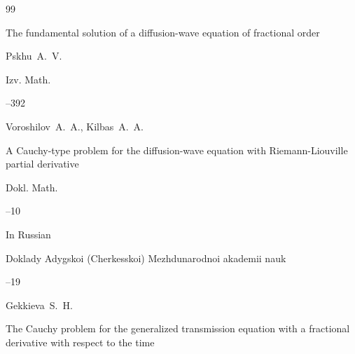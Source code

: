 \begin{thebibliography}{99}

\paper The fundamental solution of a diffusion-wave equation of fractional order

\by Pskhu~A.~V.

\jour Izv. Math.




--392










\by Voroshilov~A.~A., Kilbas~A.~A.

\paper A Cauchy-type problem for the diffusion-wave equation with Riemann-Liouville partial derivative

\jour Dokl. Math.




--10 





\lang In Russian

\jour Doklady Adygskoi (Cherkesskoi) Mezhdunarodnoi akademii nauk




--19

\by Gekkieva~S.~H.

\paper The Cauchy problem for the generalized transmission equation with a fractional derivative with respect to the time








\end{thebibliography}
